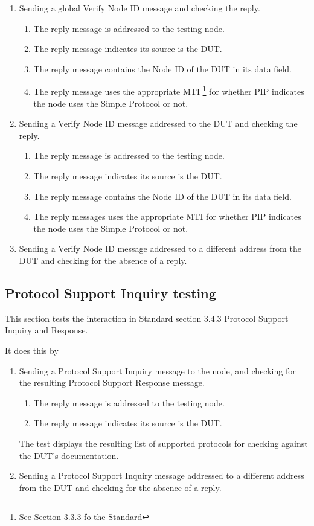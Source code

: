 \documentclass[11pt]{article}
\begin{document}
\begin{enumerate}
\item Sending a global Verify Node ID message and checking the reply.
    \begin{enumerate}
    \item The reply message is addressed to the testing node.
    \item The reply message indicates its source is the DUT.
    \item The reply message contains the Node ID of the DUT in its data field.
    \item The reply message uses the appropriate MTI
            \footnote{See Section 3.3.3 fo the Standard}
            for whether PIP indicates the node 
            uses the Simple Protocol or not.
    \end{enumerate}

\item Sending a Verify Node ID message addressed to the DUT and checking the reply.
    \begin{enumerate}
    \item The reply message is addressed to the testing node.
    \item The reply message indicates its source is the DUT.
    \item The reply message contains the Node ID of the DUT in its data field.
    \item The reply messages uses the appropriate MTI for whether PIP indicates the node 
            uses the Simple Protocol or not.
    \end{enumerate}

\item Sending a Verify Node ID message addressed to a different address from the DUT
        and checking for the absence of a reply.
\end{enumerate}

\subsection{Protocol Support Inquiry testing}

This section tests the interaction in Standard section 3.4.3 Protocol Support Inquiry and Response.

It does this by 
\begin{enumerate}
\item Sending a Protocol Support Inquiry message to the node, 
and checking for the resulting Protocol Support Response message.  
    \begin{enumerate}
    \item The reply message is addressed to the testing node.
    \item The reply message indicates its source is the DUT.
    \end{enumerate}
The test displays the resulting list of supported protocols for checking against the 
DUT's documentation.

\item Sending a Protocol Support Inquiry message addressed to a different address from the DUT
        and checking for the absence of a reply.
\end{enumerate}
\end{document}

